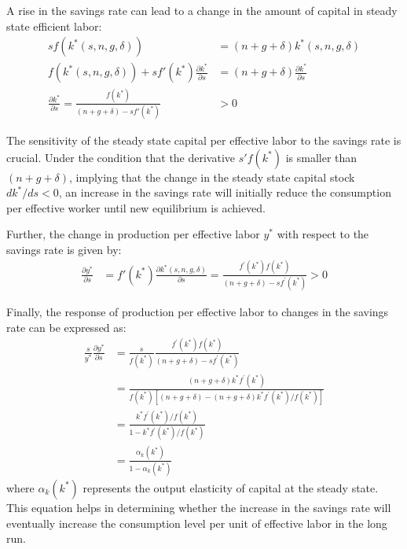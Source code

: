 A rise in the savings rate can lead to a change in the amount of capital in steady state efficient labor:
\begin{align*}
s f(k^*(s,n,g,\delta)) &= (n + g + \delta) k^*(s,n,g,\delta) \\
f(k^*(s,n,g,\delta)) + s f'(k^*) \frac{\partial k^*}{\partial s} &= (n + g + \delta) \frac{\partial k^*}{\partial s} \\
\frac{\partial k^*}{\partial s} = \frac{f(k^*)}{(n + g + \delta) - s f'(k^*)} &> 0
\end{align*}

The sensitivity of the steady state capital per effective labor to the savings rate is crucial. Under the condition that the derivative \(s'f(k^*)\) is smaller than \((n + g + \delta)\), implying that the change in the steady state capital stock \(dk^*/ds < 0\), an increase in the savings rate will initially reduce the consumption per effective worker until new equilibrium is achieved.

Further, the change in production per effective labor \(y^*\) with respect to the savings rate is given by:
\begin{align*}
\frac{\partial y^*}{\partial s} &= f'(k^*) \frac{\partial k^*(s, n, g, \delta)}{\partial s} = \frac{f^{\prime}(k^*) f(k^*)}{(n + g + \delta) - sf^{\prime}(k^*)} > 0
\end{align*}

Finally, the response of production per effective labor to changes in the savings rate can be expressed as:
\begin{align*}
    \frac{s}{y^*} \frac{\partial y^*}{\partial s} &= \frac{s}{f(k^*)} \frac{f^{\prime}(k^*) f(k^*)}{(n + g + \delta) - s f^{\prime}(k^*)} \\
    &= \frac{(n+g+\delta) k^* f^{\prime}(k^*)}{f(k^*) \left[(n+g+\delta) - (n+g+\delta) k^* f^{\prime}(k^*) / f(k^*)\right]} \\
    &= \frac{k^* f^{\prime}(k^*) / f(k^*)}{1 - k^* f^{\prime}(k^*) / f(k^*)} \\ 
    &= \frac{\alpha_k(k^*)}{1 - \alpha_k(k^*)}
    \end{align*}
where \( \alpha_k(k^*) \) represents the output elasticity of capital at the steady state. 
This equation helps in determining whether the increase in the savings rate will eventually 
increase the consumption level per unit of effective labor in the long run.

